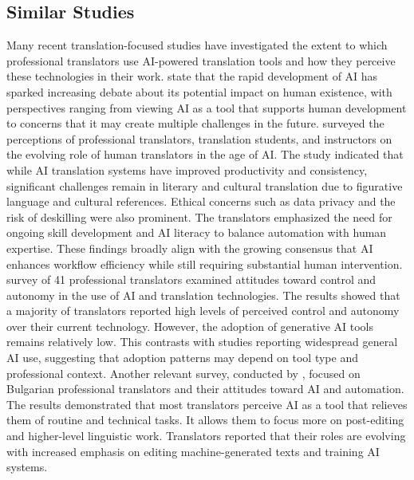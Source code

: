 \documentclass[english]{textolivre}
\begin{document}
\subsection{Similar Studies}\label{sec-organizacao}
Many recent translation-focused studies have investigated the extent to which professional translators use AI-powered translation tools and how they perceive these technologies in their work. \textcite{MoneusSahari2024LegalTranslation} state that the rapid development of AI has sparked increasing debate about its potential impact on human existence, with perspectives ranging from viewing AI as a tool that supports human development to concerns that it may create multiple challenges in the future. \textcite{AlyamiAlzubi2025HumanTranslatorsAI} surveyed the perceptions of professional translators, translation students, and instructors on the evolving role of human translators in the age of AI. The study indicated that while AI translation systems have improved productivity and consistency, significant challenges remain in literary and cultural translation due to figurative language and cultural references. Ethical concerns such as data privacy and the risk of deskilling were also prominent. The translators emphasized the need for ongoing skill development and AI literacy to balance automation with human expertise. These findings broadly align with the growing consensus that AI enhances workflow efficiency while still requiring substantial human intervention.  survey of 41 professional translators examined attitudes toward control and autonomy in the use of AI and translation technologies. The results showed that a majority of translators reported high levels of perceived control and autonomy over their current technology. However, the adoption of generative AI tools remains relatively low. This contrasts with studies reporting widespread general AI use, suggesting that adoption patterns may depend on tool type and professional context. Another relevant survey, conducted by \textcite{KirovMalamin2022TranslatorsAI}, focused on Bulgarian professional translators and their attitudes toward AI and automation. The results demonstrated that most translators perceive AI as a tool that relieves them of routine and technical tasks. It allows them to focus more on post-editing and higher-level linguistic work. Translators reported that their roles are evolving with increased emphasis on editing machine-generated texts and training AI systems.
\end{document}
